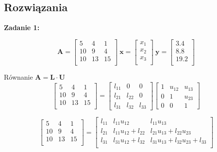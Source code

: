 \documentclass[a4paper]{article}
\begin{document}
\subsection{Rozwiązania}

\textbf{Zadanie 1:}

$$ \mathbf{A} =
\begin{bmatrix}
5 & 4 & 1 \\
10 &9 & 4 \\
10 & 13 & 15 \\
\end{bmatrix}
\ \mathbf{x} =
\begin{bmatrix}
x_{1} \\
x_{2} \\
x_{3}\\
\end{bmatrix}
\ \mathbf{y} =
\begin{bmatrix}
3.4 \\
8.8 \\
19.2 \\
\end{bmatrix}$$

Równanie $\mathbf{A} = \mathbf{L} \cdot \mathbf{U}$ 
$$\begin{bmatrix}
5 & 4 & 1 \\
10 &9 & 4 \\
10 & 13 & 15 \\
\end{bmatrix} =
\begin{bmatrix}
l_{11}      & 0      & 0 \\
l_{21} & l_{22}      & 0 \\
l_{31} & l_{32} & l_{33}
\end{bmatrix}
\begin{bmatrix}
1 & u_{12} & u_{13} \\
0      & 1 &  u_{23} \\
0      & 0      &  1
\end{bmatrix}$$

$$\begin{bmatrix}
5 & 4 & 1 \\
10 &9 & 4 \\
10 & 13 & 15 \\
\end{bmatrix} =
\begin{bmatrix}
l_{11} & l_{11}u_{12} & l_{11}u_{13} \\
l_{21} &l_{11}u_{12} + l_{22} & l_{21}u_{13} + l_{22}u_{23} \\
l_{31} & l_{31}u_{12} + l_{32} & l_{31}u_{13} + l_{32}u_{23} + l_{33} \\
\end{bmatrix}$$
\end{document}
